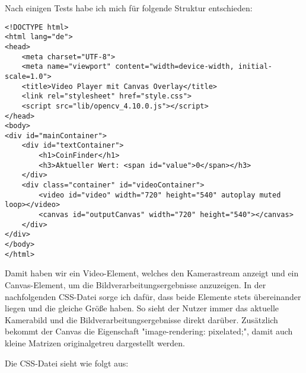 Nach einigen Tests habe ich mich für folgende Struktur entschieden:
\begin{lstlisting}[style=HTML]
<!DOCTYPE html>
<html lang="de">
<head>
    <meta charset="UTF-8">
    <meta name="viewport" content="width=device-width, initial-scale=1.0">
    <title>Video Player mit Canvas Overlay</title>
    <link rel="stylesheet" href="style.css">
    <script src="lib/opencv_4.10.0.js"></script>
</head>
<body>
<div id="mainContainer">
    <div id="textContainer">
        <h1>CoinFinder</h1>
        <h3>Aktueller Wert: <span id="value">0</span></h3>
    </div>
    <div class="container" id="videoContainer">
        <video id="video" width="720" height="540" autoplay muted loop></video>
        <canvas id="outputCanvas" width="720" height="540"></canvas>
    </div>
</div>
</body>
</html>
\end{lstlisting}

Damit haben wir ein Video-Element, welches den Kamerastream anzeigt und ein Canvas-Element, um die Bildverarbeitungsergebnisse anzuzeigen. In der nachfolgenden CSS-Datei sorge ich dafür, dass beide Elemente stets übereinander liegen und die gleiche Größe haben. So sieht der Nutzer immer das aktuelle Kamerabild und die Bildverarbeitungsergebnisse direkt darüber. Zusätzlich bekommt der Canvas die Eigenschaft "image-rendering: pixelated;", damit auch kleine Matrizen originalgetreu dargestellt werden.

Die CSS-Datei sieht wie folgt aus:

